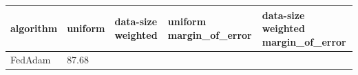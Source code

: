 \begin{tabular}{lllll}
\toprule
algorithm & uniform & data-size weighted & uniform margin_of_error & data-size weighted margin_of_error \\
\midrule
FedAdam & 87.68%
\bottomrule
\end{tabular}
